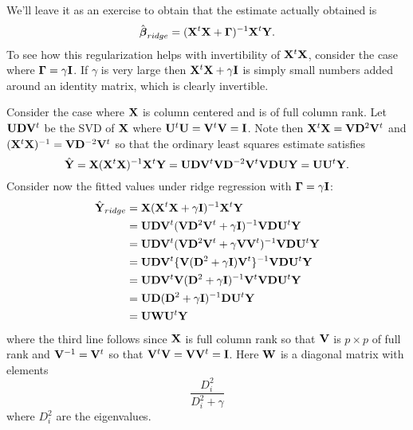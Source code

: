 We'll leave it as an exercise to obtain that the estimate actually obtained is
$$
\hat \bbeta_{ridge} = (\xtx + \bGamma)^{-1} \bX^t \bY.
$$
To see how this regularization helps with invertibility of $\xtx$, consider the case where
$\bGamma = \gamma \bI$. If $\gamma$ is very large then $\xtx + \gamma \bI$ is simply
small numbers added around an identity matrix, which is clearly invertible. 

Consider the case where $\bX$ is column centered and is of full column rank. 
Let $\bU \bD \bV^t$ be the SVD of $\bX$ where $\bU^t \bU = \bV ^t \bV = \bI$. 
Note then $\xtx = \bV \bD^2 \bV^t$ and $\xtxinv = \bV \bD^{-2} \bV^t$ so that
the ordinary least squares estimate satisfies
$$
\hat \bY = \bX \xtxinv \bX^t \bY = \bU \bD \bV^t \bV \bD^{-2} \bV^t \bV \bD \bU \bY = \bU \bU^t \bY.
$$
Consider now the fitted values under ridge regression with $\bGamma = \gamma \bI$:
\begin{align*}
\hat \bY_{ridge} 
& = \bX (\xtx + \gamma \bI)^{-1} \bX^t \bY \\
& = \bU \bD \bV^t (\bV \bD^2 \bV^t + \gamma \bI)^{-1} \bV \bD \bU^t \bY \\
& = \bU \bD \bV^t (\bV \bD^2 \bV^t + \gamma \bV \bV^t)^{-1} \bV \bD \bU^t \bY \\
& = \bU \bD \bV^t \{\bV (\bD^2 + \gamma \bI) \bV^t\}^{-1} \bV \bD \bU^t \bY \\
& = \bU \bD \bV^t \bV (\bD^2 + \gamma \bI)^{-1} \bV^t \bV \bD \bU^t \bY \\
& = \bU \bD (\bD^2 + \gamma \bI)^{-1} \bD \bU^t \bY\\
& = \bU \bW \bU^t \bY
\end{align*}
where the third line follows since $\bX$ is full column rank so that $\bV$ is $p\times p$ of full rank
and $\bV^{-1} = \bV^t$ so that $\bV^t \bV = \bV \bV^t = \bI$. Here $\bW$ is a diagonal matrix with elements
$$
\frac{D_i^2}{D_i^2 + \gamma}
$$
where $D_i^2$ are the eigenvalues. 

